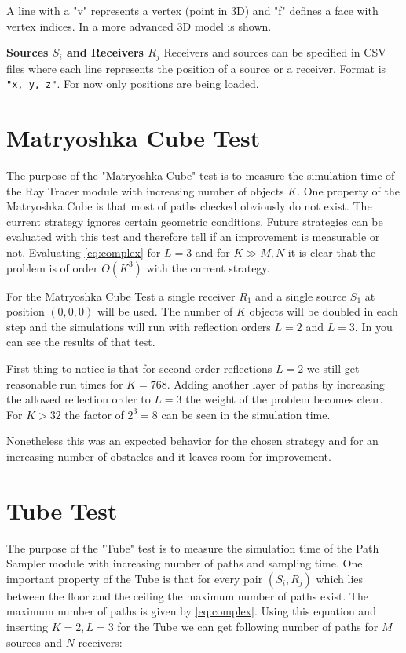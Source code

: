 A line with a "v" represents a vertex (point in 3D) and "f" defines a face with vertex indices.
In  a more advanced 3D model is shown.


\textbf{Sources $S_i$ and Receivers $R_j$}\newline
Receivers and sources can be specified in CSV files where each line represents the position of a source or a receiver. 
Format is \texttt{"x, y, z"}.
For now only positions are being loaded.

\section{Matryoshka Cube Test}
The purpose of the "Matryoshka Cube" test is to measure the simulation time of the Ray Tracer module with increasing number of objects $K$.
One property of the Matryoshka Cube is that most of paths checked obviously do not exist.
The current strategy ignores certain geometric conditions.
Future strategies can be evaluated with this test and therefore tell if an improvement is measurable or not.
Evaluating \eqref{eq:complex} for $L=3$ and for $K \gg M,N$ it is clear that the problem is of order $O(K^3)$ with the current strategy.

For the Matryoshka Cube Test a single receiver $R_1$ and a single source $S_1$ at position $(0,0,0)$ will be used.
The number of $K$ objects will be doubled in each step and the simulations will run with reflection orders $L=2$ and $L=3$.
In  you can see the results of that test.



First thing to notice is that for second order reflections $L=2$ we still get reasonable run times for $K=768$.
Adding another layer of paths by increasing the allowed reflection order to $L=3$ the weight of the problem becomes clear.
For $K>32$ the factor of $2^3=8$ can be seen in the simulation time.

Nonetheless this was an expected behavior for the chosen strategy and for an increasing number of obstacles and it leaves room for improvement.

\section{Tube Test}
The purpose of the "Tube" test is to measure the simulation time of the Path Sampler module with increasing number of paths and sampling time.
One important property of the Tube is that for every pair $(S_i, R_j)$ which lies between the floor and the ceiling the maximum number of paths exist.
The maximum number of paths is given by \eqref{eq:complex}.
Using this equation and inserting $K=2, L=3$ for the Tube we can get following number of paths for $M$ sources and $N$ receivers:

